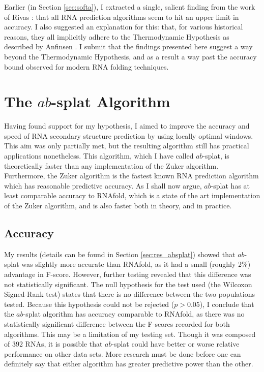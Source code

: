 \documentclass{cshonours}
\begin{document}
Earlier (in Section \ref{sec:softa}), I extracted a single, salient finding from the work of Rivas \cite{rivas2013four}: that all RNA prediction algorithms seem to hit an upper limit in accuracy. I also suggested an explanation for this: that, for various historical reasons, they all implicitly adhere to the Thermodynamic Hypothesis as described by Anfinsen \cite{anfinsen1973principles}. I submit that the findings presented here suggest a way beyond the Thermodynamic Hypothesis, and as a result a way past the accuracy bound observed for modern RNA folding techniques.


\section{The $ab$-splat Algorithm}

Having found support for my hypothesis, I aimed to improve the accuracy and speed of RNA secondary structure prediction by using locally optimal windows. This aim was only partially met, but the resulting algorithm still has practical applications nonetheless. This algorithm, which I have called $ab$-splat, is theoretically faster than any implementation of the Zuker algorithm. Furthermore, the Zuker algorithm is the fastest known RNA prediction algorithm which has reasonable predictive accuracy. As I shall now argue, $ab$-splat has at least comparable accuracy to RNAfold, which is a state of the art implementation of the Zuker algorithm, and is also faster both in theory, and in practice.

\subsection{Accuracy}

My results (details can be found in Section \ref{sec:res_absplat}) showed that $ab$-splat was slightly more accurate than RNAfold, as it had a small (roughly 2\%) advantage in F-score. However, further testing revealed that this difference was not statistically significant. The null hypothesis for the test used (the Wilcoxon Signed-Rank test) states that there is no difference between the two populations tested. Because this hypothesis could not be rejected ($p > 0.05$), I conclude that the $ab$-splat algorithm has accuracy comparable to RNAfold, as there was no statistically significant difference between the F-scores recorded for both algorithms. This may be a limitation of my testing set. Though it was composed of 392 RNAs, it is possible that $ab$-splat could have better or worse relative performance on other data sets. More research must be done before one can definitely say that either algorithm has greater predictive power than the other.
\end{document}
